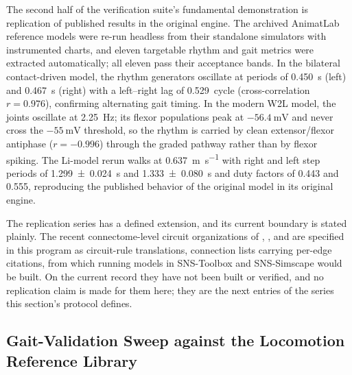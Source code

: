 The second half of the verification suite's fundamental demonstration is replication of published results in the original engine. The archived AnimatLab reference models were re-run headless from their standalone simulators with instrumented charts, and eleven targetable rhythm and gait metrics were extracted automatically; all eleven pass their acceptance bands. In the bilateral contact-driven model, the rhythm generators oscillate at periods of \qty{0.450}{\second} (left) and \qty{0.467}{\second} (right) with a left--right lag of \qty{0.529}{cycle} (cross-correlation $r = 0.976$), confirming alternating gait timing. In the modern W2L model, the joints oscillate at \qty{2.25}{\Hz}; its flexor populations peak at $-\qty{56.4}{\mV}$ and never cross the $-\qty{55}{\mV}$ threshold, so the rhythm is carried by clean extensor/flexor antiphase ($r = -0.996$) through the graded pathway rather than by flexor spiking. The Li-model rerun \citep{li_bipedal_2017} walks at \qty{0.637}{\meter\per\second} with right and left step periods of \qty{1.299 \pm 0.024}{\second} and \qty{1.333 \pm 0.080}{\second} and duty factors of 0.443 and 0.555, reproducing the published behavior of the original model in its original engine.

The replication series has a defined extension, and its current boundary is stated plainly. The recent connectome-level circuit organizations of \citet{shevtsova_modeling_2016}, \citet{dirusso_investigating_2023}, and \citet{shinohara_mechanisms_2025} are specified in this program as circuit-rule translations, connection lists carrying per-edge citations, from which running models in SNS-Toolbox and SNS-Simscape would be built. On the current record they have not been built or verified, and no replication claim is made for them here; they are the next entries of the series this section's protocol defines.

\subsection{Gait-Validation Sweep against the Locomotion Reference Library}\label{sec:gait_library_results}

